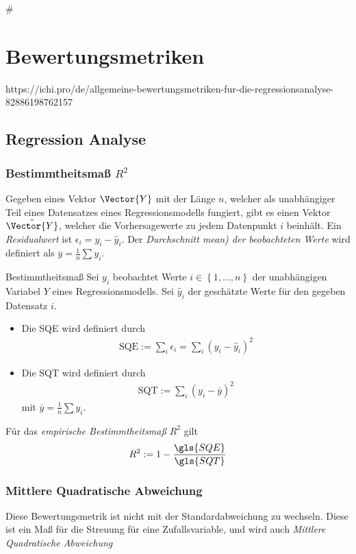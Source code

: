 #\section{Bewertungsmetriken}
https://ichi.pro/de/allgemeine-bewertungsmetriken-fur-die-regressionsanalyse-82886198762157

\subsection{Regression Analyse}
\subsubsection{Bestimmtheitsmaß $R^2$}
Gegeben eines Vektor $\Vector{Y}$ mit der Länge $n$, welcher als unabhängiger Teil eines Datensatzes eines Regressionsmodells fungiert, gibt es einen Vektor $\hat{\Vector{Y}}$, welcher die Vorhersagewerte zu jedem Datenpunkt $i$ beinhält. Ein \textit{Residualwert} ist $
\epsilon_i = y_i - \hat{y}_i$. Der \textit{Durchschnitt mean) der beobachteten Werte} wird definiert als $\overline{y}=\frac{1}{n}\sum y_i$. 
\begin{Definition}{Bestimmtheitsmaß}
	Sei $y_i$ beobachtet Werte $i\in \left\lbrace 1, \dots, n\right\rbrace$ der unabhängigen Variabel $Y$  eines Regressionsmodells. Sei $\hat{y}_i$ der geschätzte Werte für den gegeben Datensatz $i$.
	\begin{itemize}
		\item Die \gls{SQE} wird definiert durch 
		\begin{align}
			\text{SQE}:=\sum_i \epsilon_i = \sum_i (y_i - \hat{y}_i)^2 
		\end{align}
		\item Die \gls{SQT} wird definiert durch
		\begin{align}
			\text{SQT}:=\sum_i (y_i - \overline{y})^2
		\end{align}
		mit $\overline{y} = \frac{1}{n}\sum y_i$.
	\end{itemize} 
	Für das \textit{empirische Bestimmtheitsmaß} $R^2$ gilt
	\begin{align}
		R^2 := 1 - \frac{\gls{SQE}}{\gls{SQT}}
	\end{align}
\end{Definition}

\subsubsection{Mittlere Quadratische Abweichung}
Diese Bewertungsmetrik ist nicht mit der Standardabweichung zu wechseln. Diese ist ein Maß für die Streuung für eine Zufallsvariable, und wird auch \textit{Mittlere Quadratische Abweichung}

